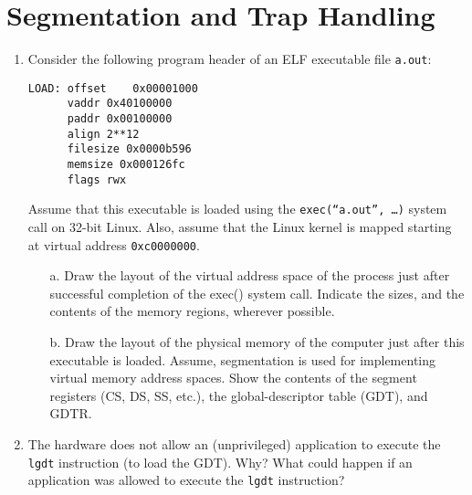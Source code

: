 \section{Segmentation and Trap Handling}
\label{sec:segmentation}
\begin{enumerate}
\item
Consider the following program header of an ELF executable file {\tt a.out}:
\begin{verbatim}
LOAD: offset    0x00001000
      vaddr 0x40100000
      paddr 0x00100000
      align 2**12
      filesize 0x0000b596
      memsize 0x000126fc
      flags rwx
\end{verbatim}
Assume that this executable is loaded using the {\tt exec(“a.out”, …)} system call on 32-bit Linux.
Also, assume that the Linux kernel is mapped starting at virtual address {\tt 0xc0000000}.
\begin{enumerate}
\item[a.] Draw the layout of
the virtual address space of the process just after successful completion of
the exec() system call. Indicate the sizes, and the contents of the memory regions, wherever possible.
\item[b.] Draw the layout of the physical memory of the computer just after this
executable is loaded. Assume, segmentation is used for implementing virtual memory address
spaces. Show the contents of the segment registers (CS, DS, SS, etc.),
the global-descriptor table (GDT), and
GDTR.
\end{enumerate}

\item The hardware does not allow an (unprivileged)
application to execute the {\tt lgdt} instruction (to load
the GDT). Why? What could happen if an application was allowed to execute the {\tt lgdt} instruction?


\end{enumerate}

